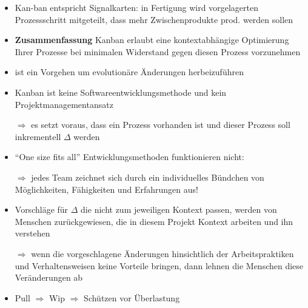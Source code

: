 \begin{itemize}
  \item Kan-ban entspricht Signalkarten: in Fertigung wird vorgelagerten Prozessschritt mitgeteilt,
    dass mehr Zwischenprodukte prod. werden sollen
  \item \textbf{Zusammenfassung} Kanban erlaubt eine kontextabhängige Optimierung Ihrer Prozesse bei
    minimalen Widerstand gegen diesen Prozess vorzunehmen
  \item ist ein Vorgehen um evolutionäre Änderungen herbeizuführen
  \item Kanban ist keine Softwareentwicklungsmethode und kein Projektmanagementansatz

    $\Rightarrow$  es setzt voraus, dass ein Prozess vorhanden ist und dieser Prozess soll
    inkrementell $\Delta$ werden
  \item \enquote{One size fits all} Entwicklungsmethoden funktionieren nicht:
    $\Rightarrow$ jedes Team zeichnet sich durch ein individuelles Bündchen von Möglichkeiten, Fähigkeiten und
    Erfahrungen aus!
  \item Vorschläge für $\Delta$ die nicht zum jeweiligen Kontext passen, werden von Menschen
    zurückgewiesen, die in diesem Projekt Kontext arbeiten und ihn verstehen

    $\Rightarrow$  wenn die vorgeschlagene Änderungen hinsichtlich der Arbeitspraktiken und
    Verhaltensweisen keine Vorteile bringen, dann lehnen die Menschen diese Veränderungen ab
  \item Pull $\Rightarrow$ Wip $\Rightarrow$ Schützen vor Überlastung
\end{itemize}


